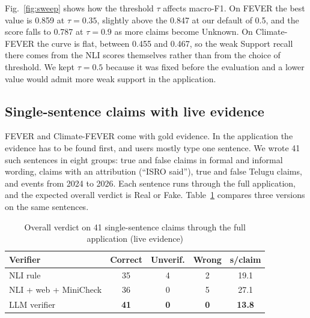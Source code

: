 \documentclass[conference]{IEEEtran}
\begin{document}
Fig.~\ref{fig:sweep} shows how the threshold $\tau$ affects macro-F1. On FEVER the best value is 0.859 at $\tau=0.35$, slightly above the 0.847 at our default of 0.5, and the score falls to 0.787 at $\tau=0.9$ as more claims become Unknown. On Climate-FEVER the curve is flat, between 0.455 and 0.467, so the weak Support recall there comes from the NLI scores themselves rather than from the choice of threshold. We kept $\tau=0.5$ because it was fixed before the evaluation and a lower value would admit more weak support in the application.

\subsection{Single-sentence claims with live evidence}
\label{sec:liveres}
FEVER and Climate-FEVER come with gold evidence. In the application the evidence has to be found first, and users mostly type one sentence. We wrote 41 such sentences in eight groups: true and false claims in formal and informal wording, claims with an attribution (``ISRO said''), true and false Telugu claims, and events from 2024 to 2026. Each sentence runs through the full application, and the expected overall verdict is Real or Fake. Table~\ref{tab:live} compares three versions on the same sentences.

\begin{table}[t]
\caption{Overall verdict on 41 single-sentence claims through the full application (live evidence)}
\label{tab:live}
\centering
\footnotesize
\setlength{\tabcolsep}{3pt}
\begin{tabular}{@{}lcccc@{}}
\toprule
Verifier & Correct & Unverif. & Wrong & s/claim \\
\midrule
NLI rule & 35 & 4 & 2 & 19.1 \\
NLI + web + MiniCheck & 36 & 0 & 5 & 27.1 \\
LLM verifier & \textbf{41} & \textbf{0} & \textbf{0} & \textbf{13.8} \\
\bottomrule
\end{tabular}
\end{table}
\end{document}
